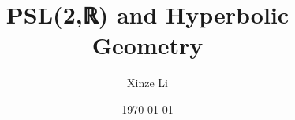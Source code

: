\documentclass{report}
\begin{document}
\title{PSL(2,ℝ) and Hyperbolic Geometry}
\author{Xinze Li}
\date{\today}

\maketitle

\tableofcontents


\end{document}
